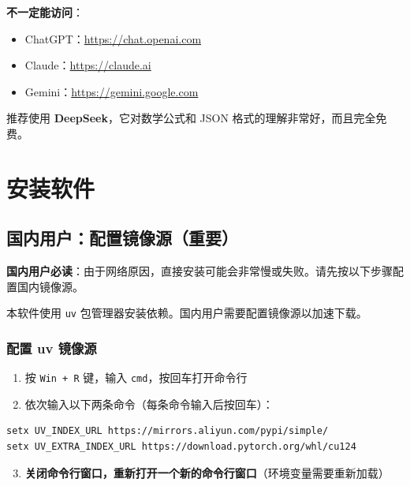\documentclass[UTF8,zihao=-4,openany]{ctexbook}
\begin{document}
\textbf{不一定能访问}：
\begin{itemize}
	\item ChatGPT：\url{https://chat.openai.com}
	\item Claude：\url{https://claude.ai}
	\item Gemini：\url{https://gemini.google.com}
\end{itemize}

\begin{TipBox}
	推荐使用 \textbf{DeepSeek}，它对数学公式和 JSON 格式的理解非常好，而且完全免费。
\end{TipBox}

\chapter{安装软件}

\section{国内用户：配置镜像源（重要）}

\begin{WarnBox}
	\textbf{国内用户必读}：由于网络原因，直接安装可能会非常慢或失败。请先按以下步骤配置国内镜像源。
\end{WarnBox}

本软件使用 \texttt{uv} 包管理器安装依赖。国内用户需要配置镜像源以加速下载。

\subsection{配置 uv 镜像源}

\begin{enumerate}
	\item 按 \texttt{Win + R} 键，输入 \texttt{cmd}，按回车打开命令行
	\item 依次输入以下两条命令（每条命令输入后按回车）：
\end{enumerate}

\begin{lstlisting}[language=bash]
setx UV_INDEX_URL https://mirrors.aliyun.com/pypi/simple/
setx UV_EXTRA_INDEX_URL https://download.pytorch.org/whl/cu124
\end{lstlisting}

\begin{enumerate}
	\setcounter{enumi}{2}
	\item \textbf{关闭命令行窗口，重新打开一个新的命令行窗口}（环境变量需要重新加载）
\end{enumerate}
\end{document}
